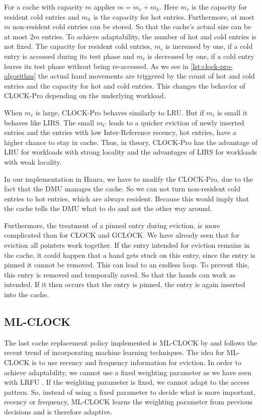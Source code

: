 \documentclass[
	12pt,
	a4paper,
	abstract,
	bibliography=totoc,
	chapterprefix,
	headings=openright,
	numbers=endperiod,
	parskip=half,
	twoside,
]{scrreprt}
\begin{document}
For a cache with capacity $m$ applies $m = m_c + m_h$.
Here $m_c$ is the capacity for resident cold entries and $m_h$ is the capacity for hot entries.
Furthermore, at most $m$ non-resident cold entries can be stored.
So that the cache's actual size can be at most $2m$ entries.
To achieve adaptability, the number of hot and cold entries is not fixed.
The capacity for resident cold entries, $m_c$ is increased by one, if a cold entry is accessed during its test phase 
and $m_c$ is decreased by one, if a cold entry leaves its test phase without being re-accessed.
As we see in \cref{lst:clock-pro-algorithm} the actual hand movements are triggered by the count of hot and cold entries and the 
capacity for hot and cold entries.
This changes the behavior of CLOCK-Pro depending on the underlying workload.

When $m_c$ is large, CLOCK-Pro behaves similarly to LRU. But if $m_c$ is small it behaves like LIRS.
The small $m_C$ leads to a quicker eviction of newly inserted entries and the entries with low Inter-Reference recency, 
hot entries, have a higher 
chance to stay in cache. Thus, in theory, CLOCK-Pro has the advantage of LRU for workloads with strong locality and 
the advantages of LIRS for workloads with weak locality.

In our implementation in Haura, we have to modify the CLOCK-Pro, due to the fact that the DMU manages the cache.
So we can not turn non-resident cold entries to hot entries, which are always resident.
Because this would imply that the cache tells the DMU what to do and not the other way around.

Furthermore, the treatment of a pinned entry during eviction, is more complicated than for CLOCK and GCLOCK.
We have already seen that for eviction all pointers work together. If the entry intended for eviction remains in the cache, it could happen that a 
hand gets stuck on this entry, since the entry is pinned it cannot be removed. This can lead to an endless loop. To prevent this, this entry is 
removed and temporally saved. So that the hands can work as intended.
If it then occurs that the entry is pinned, the entry is again inserted into the cache.

\subsection{ML-CLOCK}
\label{sub:ml-clock}

The last cache replacement policy implemented is ML-CLOCK by \cite{cho2021ml} and 
follows the recent trend of incorporating machine learning techniques.
The idea for ML-CLOCK is to use recency and frequency information for eviction.
In order to achieve adaptability, we cannot use a fixed weighting parameter as we have seen with LRFU \cite{lee2001lrfu}. 
If the weighting parameter is fixed, we cannot adapt to the access pattern.
So, instead of using a fixed parameter to decide what is more important, recency 
or frequency,
ML-CLOCK learns the weighting parameter from previous decisions and is therefore adaptive.
\end{document}
